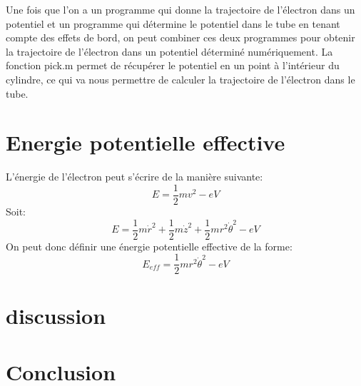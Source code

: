 \documentclass[a4paper,12pt]{article}
\begin{document}
Une fois que l'on a un programme qui donne la trajectoire de l'électron dans un potentiel et un programme qui détermine le potentiel dans le tube en tenant compte des effets de bord, on peut combiner ces deux programmes pour obtenir la trajectoire de l'électron dans un potentiel déterminé numériquement. La fonction pick.m permet de récupérer le potentiel en un point à l'intérieur du cylindre, ce qui va nous permettre de calculer la trajectoire de l'électron dans le tube.

\section{Energie potentielle effective}
L'énergie de l'électron peut s'écrire de la manière suivante:
\[
E = \frac 1 2 mv^2 - eV
\]
Soit:
\[
E = \frac 1 2 m \dot{r}^2 + \frac 1 2 m \dot{z}^2 + \frac 1 2 m r^2 \dot{\theta}^2 - e V
\]
On peut donc définir une énergie potentielle effective de la forme:
\[
E_{eff} = \frac 1 2 m r^2 \dot{\theta}^2 -e V
\]



\section{discussion}



\section{Conclusion}
\end{document}
